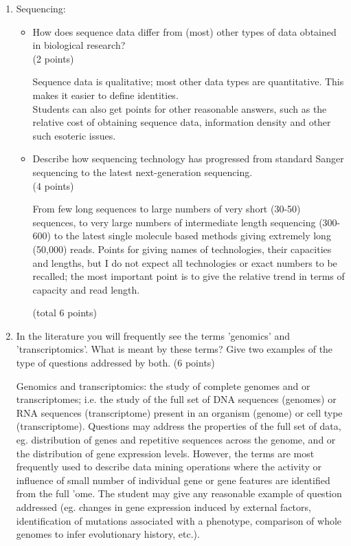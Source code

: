 \documentclass[11pt]{article}
\begin{document}
\begin{enumerate}
\item Sequencing:
  \begin{itemize}
    \item How does sequence data differ from (most) other types of data obtained
      in biological research?\\
      (2 points)\\
\begin{Notes}
  Sequence data is qualitative; most other data types are quantitative. This
  makes it easier to define identities. \\
  Students can also get points for other
  reasonable answers, such as the relative cost of obtaining sequence data,
  information density and other such esoteric issues.
\end{Notes}
    \item Describe how sequencing technology has progressed from standard
      Sanger sequencing to the latest next-generation sequencing.\\
      (4 points)\\
\begin{Notes}
  From few long sequences to large numbers of very short (30-50) sequences, to
  very large numbers of intermediate length sequencing (300-600) to the
  latest single molecule based methods giving extremely long (50,000)
  reads. Points for giving names of technologies, their capacities and
  lengths, but I do not expect all technologies or exact numbers to be
  recalled; the most important point is to give the relative trend in
  terms of capacity and read length.
\end{Notes}
(total 6 points)\\
  \end{itemize}
\item In the literature you will frequently see the terms 'genomics' and
  'transcriptomics'. What is meant by these terms? Give two examples of the type
  of questions addressed by both.
  (6 points)\\
\begin{Notes}
  Genomics and transcriptomics: the study of complete genomes and or
  transcriptomes; i.e. the study of the full set of DNA sequences (genomes) or
  RNA sequences (transcriptome) present in an organism (genome) or cell type
  (transcriptome). Questions may address the properties of the full set of
  data, eg. distribution of genes and repetitive sequences across the genome,
  and or the distribution of gene expression levels. However, the terms are
  most frequently used to describe data mining operations where the activity
  or influence of small number of individual gene or gene features are
  identified from the full 'ome. The student may give any reasonable example
  of question addressed (eg. changes in gene expression induced by external
  factors, identification of mutations associated with a phenotype, comparison
  of whole genomes to infer evolutionary history, etc.).
\end{Notes}
\end{enumerate}
\end{document}

